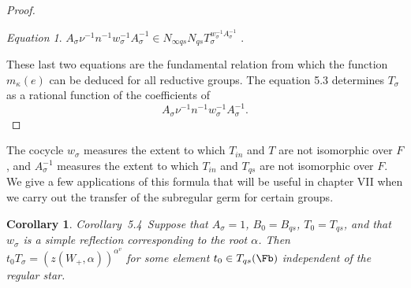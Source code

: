 \documentclass{memo-l}
\newtheorem{corollary}[theorem]{Corollary}
\theoremstyle{definition}
\theoremstyle{remark}
\newtheorem{eqn}[theorem]{Equation}
\numberwithin{section}{chapter}
\numberwithin{equation}{chapter}
\begin{document}
\begin{proof}
\begin{eqn}  %
$A_{{\sigma}}{\nu}^{-1}n^{-1}
w_{{\sigma}}^{-1}A_{{\sigma}}^{-1} \in
N_{{\infty}qs}N_{qs}T_{{\sigma}}^{w_\sigma^{-1}A_\sigma^{-1}}$ .
\end{eqn}

These last two equations are the fundamental relation from which the
function $m_{{\kappa}}(e)$ can be deduced for all reductive groups.
The equation 5.3 determines $T_{{\sigma}}$ as a rational function of
the coefficients
of $$A_{{\sigma}}{\nu}^{-1}n^{-1}w_{{\sigma}}^{-1}A_{{\sigma}}^{-1}.$$
\end{proof}

The cocycle $w_{{\sigma}}$ measures the extent to which $T_{in}$ and
$T$ are not isomorphic over $F$, and $A_{{\sigma}}^{-1}$ measures the
extent to which $T_{in}$ and $T_{qs}$ are not isomorphic over $F$.  We
give a few applications of this formula that will be useful in chapter
VII when we carry out the transfer of the subregular germ for certain
groups.

\medskip

\begin{corollary}{Corollary\ 5.4}\   Suppose that $A_{{\sigma}} = 1$, $B_{0} = B_{qs}$,
$T_{0} = T_{qs}$, and that $w_{{\sigma}}$ is a simple reflection corresponding
to the root ${\alpha}$.
 Then $t_{0}T_{{\sigma}} = (z(W_{+},{\alpha}))^{\alpha^v}$  for some
element $t_{0} \in T_{qs}(\Fb)$ independent of the regular star.
\end{corollary}
\end{document}
